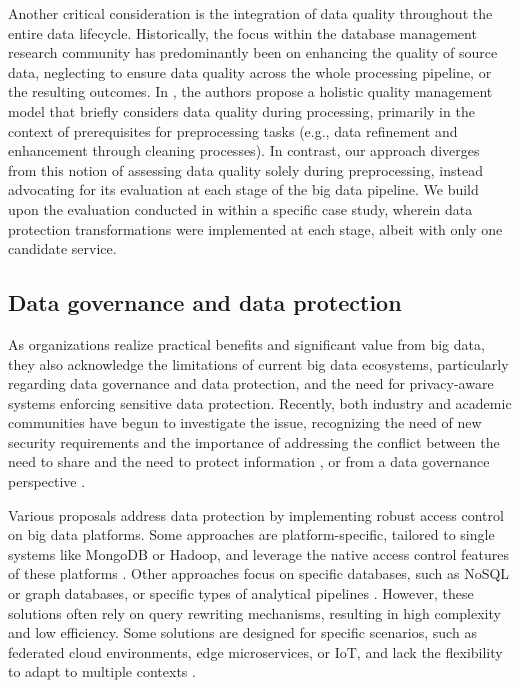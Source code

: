 Another critical consideration is the integration of data quality throughout the entire data lifecycle. Historically, the focus within the database management research community has predominantly been on enhancing the quality of source data, neglecting to ensure data quality across the whole processing pipeline, or the resulting outcomes. In \cite{BigDataQaulitySurvey}, %
the authors propose a holistic quality management model that briefly considers data quality during processing, primarily in the context of prerequisites for preprocessing tasks (e.g., data refinement and enhancement through cleaning processes). In contrast, our approach diverges from this notion of assessing data quality solely during preprocessing, instead advocating for its evaluation at each stage of the big data pipeline. We build upon the evaluation conducted in \cite{impetusPaper} within a specific case study, wherein data protection transformations were implemented at each stage, albeit with only one candidate service.

\subsection{Data governance and data protection}\label{sec:datagov}

As organizations realize practical benefits and significant value from big data, they also acknowledge the limitations of current big data ecosystems, particularly regarding data governance and data protection, and the need for privacy-aware systems enforcing sensitive data protection. Recently, both industry and academic communities have begun to investigate the issue, recognizing the need of new security requirements \cite{Colombo:JournCybersec:2019} and the importance of addressing the conflict between the need to share and the need to protect information \cite{balancingact,VANDENBROEK2018330,balancingInMedicine,needtobalance,dataProtection}, or from a data governance perspective \cite{al2018exploring,aissa2020decide}.

Various proposals address data protection by implementing robust access control on big data platforms. Some approaches are platform-specific, tailored to single systems like MongoDB or Hadoop, and leverage the native access control features of these platforms \cite{rathore2017hadoop,anisetti2018privacy,FederationAC:Journ:2020,Sandhu:ABAC:2018,GuptaSandu:2017}. Other approaches focus on specific databases, such as NoSQL or graph databases, or specific types of analytical pipelines  \cite{AConGraphDB:2021, AConMongoDB:2022, ABACforHBase:2019}. However, these solutions often rely on query rewriting mechanisms, resulting in high complexity and low efficiency. Some solutions are designed for specific scenarios, such as federated cloud environments, edge microservices, or IoT, and lack the flexibility to adapt to multiple contexts \cite{MultipartyAC:2019, IoTSecurity}.

